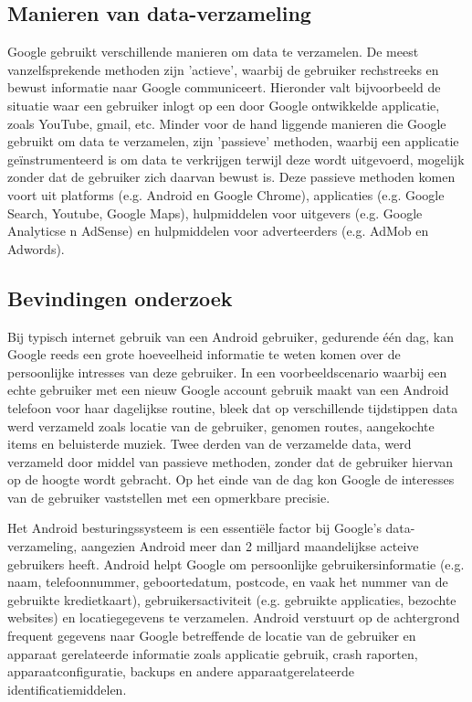 \subsection{Manieren van data-verzameling} \label{ways-of-data-collection}

Google gebruikt verschillende manieren om data te verzamelen. De meest vanzelfsprekende methoden zijn 'actieve', waarbij de gebruiker rechstreeks en bewust informatie naar Google communiceert. Hieronder valt bijvoorbeeld de situatie waar een gebruiker inlogt op een door Google ontwikkelde applicatie, zoals YouTube, gmail, etc. Minder voor de hand liggende manieren die Google gebruikt om data te verzamelen, zijn 'passieve' methoden, waarbij een applicatie geïnstrumenteerd is om data te verkrijgen terwijl deze wordt uitgevoerd, mogelijk zonder dat de gebruiker zich daarvan bewust is. Deze passieve methoden komen voort uit platforms (e.g. Android en Google Chrome), applicaties (e.g. Google Search, Youtube, Google Maps), hulpmiddelen voor uitgevers (e.g. Google Analyticse n AdSense) en hulpmiddelen voor adverteerders (e.g. AdMob en Adwords).

\subsection{Bevindingen onderzoek}

Bij typisch internet gebruik van een Android gebruiker, gedurende één dag, kan Google reeds een grote hoeveelheid informatie te weten komen over de persoonlijke intresses van deze gebruiker. In een voorbeeldscenario waarbij een echte gebruiker met een nieuw Google account gebruik maakt van een Android telefoon voor haar dagelijkse routine, bleek dat op verschillende tijdstippen data werd verzameld zoals locatie van de gebruiker, genomen routes, aangekochte items en beluisterde muziek. Twee derden van de verzamelde data, werd verzameld door middel van passieve methoden, zonder dat de gebruiker hiervan op de hoogte wordt gebracht. Op het einde van de dag kon Google de interesses van de gebruiker vaststellen met een opmerkbare precisie.

Het Android besturingssysteem is een essentiële factor bij Google's data-verzameling, aangezien Android meer dan 2 milljard maandelijkse acteive gebruikers heeft. Android helpt Google om persoonlijke gebruikersinformatie (e.g. naam, telefoonnummer, geboortedatum, postcode, en vaak het nummer van de gebruikte kredietkaart), gebruikersactiviteit (e.g. gebruikte applicaties, bezochte websites) en locatiegegevens te verzamelen. Android verstuurt op de achtergrond frequent gegevens naar Google betreffende de locatie van de gebruiker en apparaat gerelateerde informatie zoals applicatie gebruik, crash raporten, apparaatconfiguratie, backups en andere apparaatgerelateerde identificatiemiddelen.

